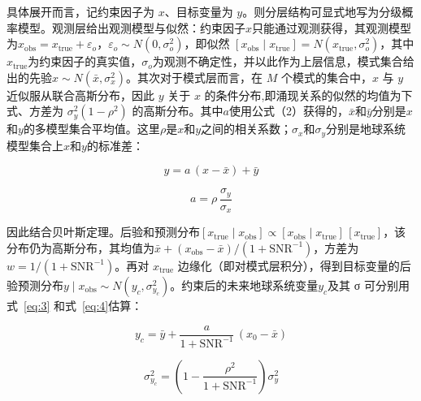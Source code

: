 \documentclass[draft]{agujournal2019}
\begin{document}
具体展开而言，记约束因子为 \(x\)、目标变量为 \(y\)。则分层结构可显式地写为分级概率模型。观测层给出观测模型与似然：约束因子\(x\)只能通过观测获得，其观测模型为\(x_{\mathrm{obs}} = x_{\mathrm{true}} + \varepsilon_o\)，\(\varepsilon_o \sim N(0, \sigma_o^2)\)，即似然 \([x_{\mathrm{obs}} \mid x_{\mathrm{true}}] = N(x_{\mathrm{true}}, \sigma_o^2)\)，其中\(x_{\mathrm{true}}\)为约束因子的真实值，\(\sigma_o\)为观测不确定性，并以此作为上层信息，模式集合给出的先验\(x \sim N(\bar{x}, \sigma_x^2)\)。其次对于模式层而言，在 \(M\) 个模式的集合中，\(x\) 与 \(y\) 近似服从联合高斯分布，因此 \(y\) 关于 \(x\) 的条件分布,即涌现关系的似然的均值为下式、方差为 \(\sigma_y^2(1-\rho^2)\) 的高斯分布。其中\(a\)使用公式（2）获得的，\(\bar{x}\)和\(\bar{y}\)分别是\(x\)和\(y\)的多模型集合平均值。这里\(\rho\)是\(x\)和\(y\)之间的相关系数；\(\sigma_x\)和\(\sigma_y\)分别是地球系统模型集合上\(x\)和\(y\)的标准差：

\begin{linenomath*}
\begin{equation}
y = a\,(x - \bar{x}) + \bar{y}
\label{eq:1}
\end{equation}
\end{linenomath*}

\begin{linenomath*}
\begin{equation}
a = \rho\,\frac{\sigma_y}{\sigma_x}
\label{eq:2}
\end{equation}
\end{linenomath*}

因此结合贝叶斯定理。后验和预测分布\([x_{\mathrm{true}} \mid x_{\mathrm{obs}}] \propto [x_{\mathrm{obs}} \mid x_{\mathrm{true}}]\,[x_{\mathrm{true}}]\)，该分布仍为高斯分布，其均值为\(\bar{x} + (x_{\mathrm{obs}}-\bar{x})/(1+\mathrm{SNR}^{-1})\)，方差为\(w=1/(1+\mathrm{SNR}^{-1})\)。再对 \(x_{\mathrm{true}}\) 边缘化（即对模式层积分），得到目标变量的后验预测分布\(y \mid x_{\mathrm{obs}} \sim N(y_c, \sigma_{y_c}^2)\)。约束后的未来地球系统变量\(y_c\)及其 σ 可分别用式~\eqref{eq:3} 和式~\eqref{eq:4}估算：

\begin{linenomath*}
\begin{equation}
y_c = \bar{y} + \frac{a}{1+\mathrm{SNR}^{-1}}\,(x_0 - \bar{x})
\label{eq:3}
\end{equation}
\end{linenomath*}

\begin{linenomath*}
\begin{equation}
\sigma_{y_c}^2 = \left(1 - \frac{\rho^2}{1+\mathrm{SNR}^{-1}}\right)\sigma_y^2
\label{eq:4}
\end{equation}
\end{linenomath*}
\end{document}
